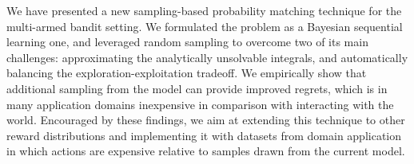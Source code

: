 \documentclass{article}
\begin{document}
We have presented a new sampling-based probability matching technique for the multi-armed bandit setting. We formulated the problem as a Bayesian sequential learning one, and leveraged random sampling to overcome two of its main challenges: approximating the analytically unsolvable integrals, and automatically balancing the exploration-exploitation tradeoff. We empirically show that additional sampling from the model can provide improved regrets, which is in many application domains inexpensive in comparison with interacting with the world. Encouraged by these findings, we aim at extending this technique to other reward distributions and implementing it with 
datasets from domain application in which actions are expensive relative to samples drawn from the current model.




\end{document}
